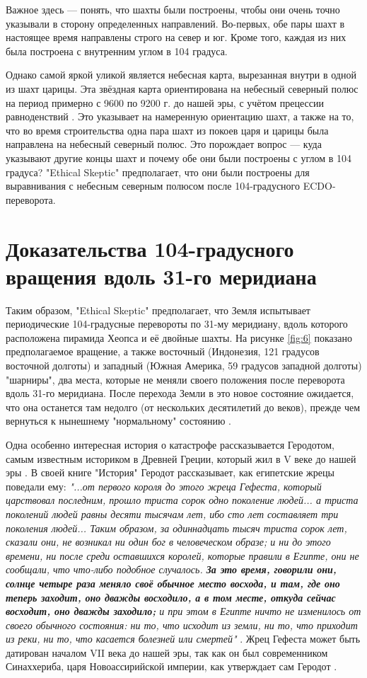 \documentclass[10pt,twocolumn,letterpaper]{article}
\begin{document}
Важное здесь — понять, что шахты были построены, чтобы они очень точно указывали в сторону определенных направлений. Во-первых, обе пары шахт в настоящее время направлены строго на север и юг. Кроме того, каждая из них была построена с внутренним углом в 104 градуса.

Однако самой яркой уликой является небесная карта, вырезанная внутри в одной из шахт царицы. Эта звёздная карта ориентирована на небесный северный полюс на период примерно с 9600 по 9200 г. до нашей эры, с учётом прецессии равноденствий \cite{28}. Это указывает на намеренную ориентацию шахт, а также на то, что во время строительства одна пара шахт из покоев царя и царицы была направлена на небесный северный полюс. Это порождает вопрос — куда указывают другие концы шахт и почему обе они были построены с углом в 104 градуса? "Ethical Skeptic" предполагает, что они были построены для выравнивания с небесным северным полюсом после 104-градусного ECDO-переворота.

\section{Доказательства 104-градусного вращения вдоль 31-го меридиана}

Таким образом, "Ethical Skeptic" предполагает, что Земля испытывает периодические 104-градусные перевороты по 31-му меридиану, вдоль которого расположена пирамида Хеопса и её двойные шахты. На рисунке \ref{fig:6} показано предполагаемое вращение, а также восточный (Индонезия, 121 градусов восточной долготы) и западный (Южная Америка, 59 градусов западной долготы) "шарниры", два места, которые не меняли своего положения после переворота вдоль 31-го меридиана. После перехода Земли в это новое состояние ожидается, что она останется там недолго (от нескольких десятилетий до веков), прежде чем вернуться к нынешнему "нормальному" состоянию \cite{150}.

Одна особенно интересная история о катастрофе рассказывается Геродотом, самым известным историком в Древней Греции, который жил в V веке до нашей эры \cite{31}. В своей книге "История" Геродот рассказывает, как египетские жрецы поведали ему: \textit{"...от первого короля до этого жреца Гефеста, который царствовал последним, прошло триста сорок одно поколение людей... а триста поколений людей равны десяти тысячам лет, ибо сто лет составляет три поколения людей... Таким образом, за одиннадцать тысяч триста сорок лет, сказали они, не возникал ни один бог в человеческом образе; и ни до этого времени, ни после среди оставшихся королей, которые правили в Египте, они не сообщали, что что-либо подобное случалось. \textbf{За это время, говорили они, солнце четыре раза меняло своё обычное место восхода, и там, где оно теперь заходит, оно дважды восходило, а в том месте, откуда сейчас восходит, оно дважды заходило;} и при этом в Египте ничто не изменилось от своего обычного состояния: ни то, что исходит из земли, ни то, что приходит из реки, ни то, что касается болезней или смертей"} \cite{32}. Жрец Гефеста может быть датирован началом VII века до нашей эры, так как он был современником Синаххериба, царя Новоассирийской империи, как утверждает сам Геродот \cite{32,33,34}.
\end{document}
